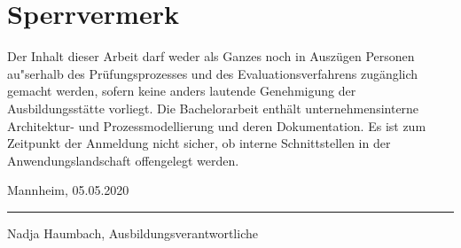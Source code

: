 \chapter*{Sperrvermerk}
Der Inhalt dieser Arbeit darf weder als Ganzes noch in Auszügen Personen au"serhalb des Prüfungsprozesses und des Evaluationsverfahrens zugänglich gemacht werden, sofern keine anders lautende Genehmigung der Ausbildungsstätte vorliegt. Die Bachelorarbeit enthält unternehmensinterne Architektur- und Prozessmodellierung und deren Dokumentation. Es ist zum Zeitpunkt der Anmeldung nicht sicher, ob interne Schnittstellen in der Anwendungslandschaft offengelegt werden.


\vspace{3cm}
\noindent Mannheim, 05.05.2020\hfill\rule{8.4cm}{.4pt}\par
\noindent\hfill Nadja Haumbach, Ausbildungsverantwortliche
\cleardoublepage

